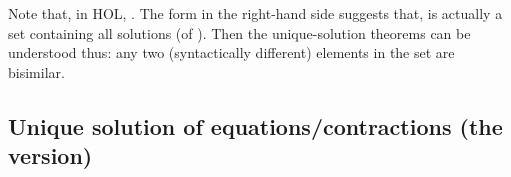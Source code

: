 Note that, in HOL, . The form in the right-hand side suggests that,
 is actually a set containing all
solutions (of ). Then the unique-solution
theorems can be understood thus: any two (syntactically different) elements
in the set are bisimilar.

\subsection{Unique solution of equations/contractions (the \multivariate version)}

